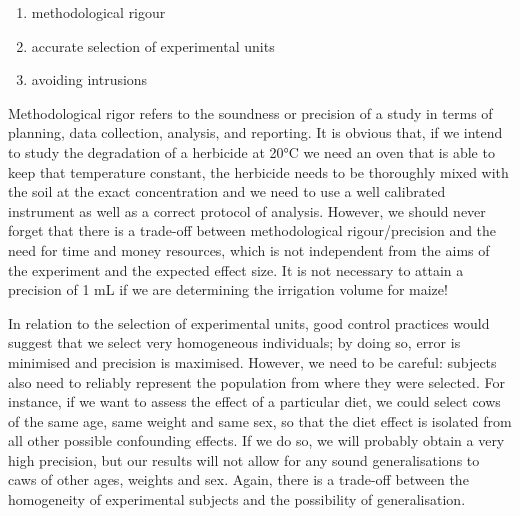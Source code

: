 \documentclass[a4paper,12pt,oneside]{book}
\providecommand{\tightlist}{%
  \setlength{\itemsep}{0pt}\setlength{\parskip}{0pt}}
\begin{document}
\begin{enumerate}
\def\labelenumi{\arabic{enumi}.}
\tightlist
\item
  methodological rigour
\item
  accurate selection of experimental units
\item
  avoiding intrusions
\end{enumerate}

Methodological rigor refers to the soundness or precision of a study in terms of planning, data collection, analysis, and reporting. It is obvious that, if we intend to study the degradation of a herbicide at 20°C we need an oven that is able to keep that temperature constant, the herbicide needs to be thoroughly mixed with the soil at the exact concentration and we need to use a well calibrated instrument as well as a correct protocol of analysis. However, we should never forget that there is a trade-off between methodological rigour/precision and the need for time and money resources, which is not independent from the aims of the experiment and the expected effect size. It is not necessary to attain a precision of 1 mL if we are determining the irrigation volume for maize!

In relation to the selection of experimental units, good control practices would suggest that we select very homogeneous individuals; by doing so, error is minimised and precision is maximised. However, we need to be careful: subjects also need to reliably represent the population from where they were selected. For instance, if we want to assess the effect of a particular diet, we could select cows of the same age, same weight and same sex, so that the diet effect is isolated from all other possible confounding effects. If we do so, we will probably obtain a very high precision, but our results will not allow for any sound generalisations to caws of other ages, weights and sex. Again, there is a trade-off between the homogeneity of experimental subjects and the possibility of generalisation.
\end{document}
